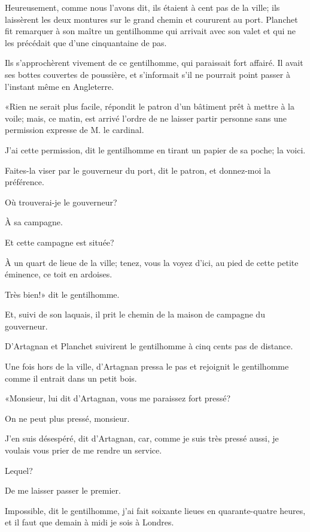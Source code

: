Heureusement, comme nous l'avons dit, ils étaient à cent pas de la ville; ils laissèrent les deux montures sur le grand chemin et coururent au port. Planchet fit remarquer à son maître un gentilhomme qui arrivait avec son valet et qui ne les précédait que d'une cinquantaine de pas. 

Ils s'approchèrent vivement de ce gentilhomme, qui paraissait fort affairé. Il avait ses bottes couvertes de poussière, et s'informait s'il ne pourrait point passer à l'instant même en Angleterre. 

«Rien ne serait plus facile, répondit le patron d'un bâtiment prêt à mettre à la voile; mais, ce matin, est arrivé l'ordre de ne laisser partir personne sans une permission expresse de M. le cardinal. 

\speak  J'ai cette permission, dit le gentilhomme en tirant un papier de sa poche; la voici. 

\speak  Faites-la viser par le gouverneur du port, dit le patron, et donnez-moi la préférence. 

\speak  Où trouverai-je le gouverneur? 

\speak  À sa campagne. 

\speak  Et cette campagne est située? 

\speak  À un quart de lieue de la ville; tenez, vous la voyez d'ici, au pied de cette petite éminence, ce toit en ardoises. 

\speak  Très bien!» dit le gentilhomme. 

Et, suivi de son laquais, il prit le chemin de la maison de campagne du gouverneur. 

D'Artagnan et Planchet suivirent le gentilhomme à cinq cents pas de distance. 

Une fois hors de la ville, d'Artagnan pressa le pas et rejoignit le gentilhomme comme il entrait dans un petit bois. 

«Monsieur, lui dit d'Artagnan, vous me paraissez fort pressé? 

\speak  On ne peut plus pressé, monsieur. 

\speak  J'en suis désespéré, dit d'Artagnan, car, comme je suis très pressé aussi, je voulais vous prier de me rendre un service. 

\speak  Lequel? 

\speak  De me laisser passer le premier. 

\speak  Impossible, dit le gentilhomme, j'ai fait soixante lieues en quarante-quatre heures, et il faut que demain à midi je sois à Londres. 

